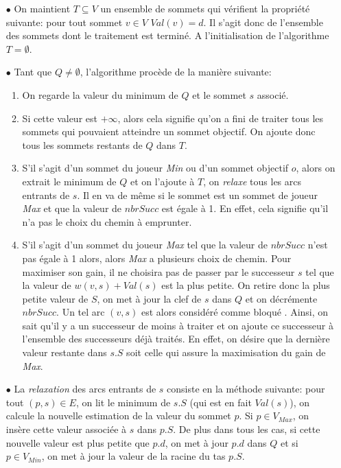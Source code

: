 \begin{enumerate}
	\item[$\bullet$] On maintient $T \subseteq V$ un ensemble de sommets qui vérifient la propriété suivante: pour tout sommet $v \in V$ $Val(v) = d$. Il s'agit donc de l'ensemble des sommets dont le traitement est terminé. A l'initialisation de l'algorithme $T = \emptyset$.
	
	\item[$\bullet$] Tant que $Q \neq \emptyset$, l'algorithme procède de la manière suivante: 
	\begin{enumerate}
		\item On regarde la valeur du minimum de $Q$ et le sommet $s$ associé.
		\item Si cette valeur est $+\infty$, alors cela signifie qu'on a fini de traiter tous les sommets qui pouvaient atteindre un sommet objectif. On ajoute donc tous les sommets restants de $Q$ dans $T$.
		\item S'il s'agit d'un sommet du joueur \textit{Min} ou d'un sommet objectif $o$, alors on extrait le minimum de $Q$ et on l'ajoute à $T$, on \textit{relaxe} tous les arcs entrants de $s$. Il en va de même si le sommet est un sommet de joueur \textit{Max} et que la valeur de $nbrSucc$ est égale à 1. En effet, cela signifie qu'il n'a pas le choix du chemin à emprunter.
		\item S'il s'agit d'un sommet du joueur \textit{Max} tel que la valeur de $nbrSucc$ n'est pas égale à 1 alors, alors \textit{Max} a plusieurs choix de chemin. Pour maximiser son gain, il ne choisira pas de passer par le successeur $s$ tel que la valeur de $w(v,s) + Val(s)$ est la plus petite. On retire donc la plus petite valeur de $S$, on met à jour la clef de $s$ dans $Q$ et on décrémente $nbrSucc$. Un tel arc $(v,s)$ est alors considéré comme \og bloqué \fg. Ainsi, on sait qu'il y a un successeur de moins à traiter et on ajoute ce successeur à l'ensemble des successeurs déjà traités. En effet, on désire que la dernière valeur restante dans $s.S$ soit celle qui assure la maximisation du gain de \textit{Max}.
	\end{enumerate}
	
	\item[$\bullet$] La \textit{relaxation} des arcs entrants de $s$ consiste en la méthode suivante: pour tout $(p,s)\in E$, on lit le minimum de $s.S$ (qui est en fait $Val(s)$), on calcule la nouvelle estimation de la valeur du sommet $p$. Si $p \in V_{Max}$, on insère cette valeur associée à $s$ dans $p.S$. De plus dans tous les cas, si cette nouvelle valeur est plus petite que $p.d$, on met à jour $p.d$ dans $Q$ et si $p \in V_{Min}$, on met à jour la valeur de la racine du tas $p.S$. 
	
\end{enumerate}

